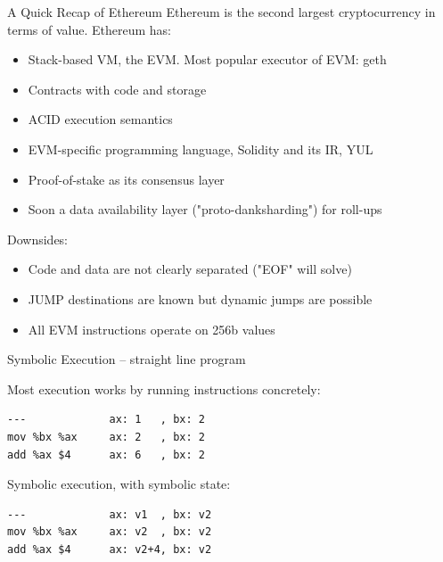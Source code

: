 \documentclass[aspectratio=169]{beamer}
\begin{document}
\begin{frame}{A Quick Recap of Ethereum}
Ethereum is the second largest cryptocurrency in terms of value. Ethereum has:
\begin{itemize}
\item Stack-based VM, the EVM. Most popular executor of EVM: geth
\item Contracts with code and storage
\item ACID execution semantics
\item EVM-specific programming language, Solidity and its IR, YUL
\item Proof-of-stake as its consensus layer
\item Soon a data availability layer ("proto-danksharding") for roll-ups
\end{itemize}

Downsides:
\begin{itemize}
\item Code and data are not clearly separated ("EOF" will solve)
\item JUMP destinations are known but dynamic jumps are possible
\item All EVM instructions operate on 256b values
\end{itemize}

\end{frame}


\begin{frame}[fragile=singleslide]{Symbolic Execution -- straight line program}

Most execution works by running instructions concretely:
\begin{verbatim}
---             ax: 1   , bx: 2
mov %bx %ax     ax: 2   , bx: 2
add %ax $4      ax: 6   , bx: 2
\end{verbatim}
\bigskip

Symbolic execution, with symbolic state:
\begin{verbatim}
---             ax: v1  , bx: v2
mov %bx %ax     ax: v2  , bx: v2
add %ax $4      ax: v2+4, bx: v2
\end{verbatim}
\end{frame}
\end{document}
